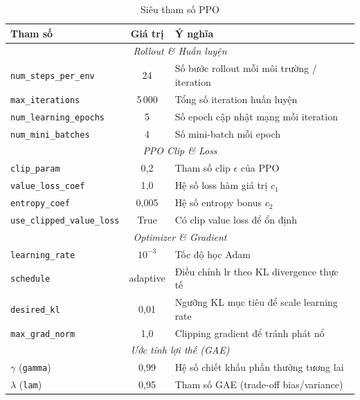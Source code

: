 \begin{table}[H]
    \centering
    \caption{Siêu tham số PPO}
    \label{tab:ppo_cfg}
    \renewcommand{\arraystretch}{1.3}
    \begin{tabular}{|l|c|l|}
    \hline
    \textbf{Tham số} & \textbf{Giá trị} & \textbf{Ý nghĩa} \\
    \hline
    \multicolumn{3}{|c|}{\textit{Rollout \& Huấn luyện}} \\
    \hline
    \texttt{num\_steps\_per\_env}    & 24      & Số bước rollout mỗi môi trường / iteration \\
    \texttt{max\_iterations}         & 5\,000  & Tổng số iteration huấn luyện \\
    \texttt{num\_learning\_epochs}   & 5       & Số epoch cập nhật mạng mỗi iteration \\
    \texttt{num\_mini\_batches}      & 4       & Số mini-batch mỗi epoch \\
    \hline
    \multicolumn{3}{|c|}{\textit{PPO Clip \& Loss}} \\
    \hline
    \texttt{clip\_param}             & 0{,}2   & Tham số clip $\epsilon$ của PPO \\
    \texttt{value\_loss\_coef}       & 1{,}0   & Hệ số loss hàm giá trị $c_1$ \\
    \texttt{entropy\_coef}           & 0{,}005 & Hệ số entropy bonus $c_2$ \\
    \texttt{use\_clipped\_value\_loss}& True   & Có clip value loss để ổn định \\
    \hline
    \multicolumn{3}{|c|}{\textit{Optimizer \& Gradient}} \\
    \hline
    \texttt{learning\_rate}          & $10^{-3}$ & Tốc độ học Adam \\
    \texttt{schedule}                & adaptive  & Điều chỉnh lr theo KL divergence thực tế \\
    \texttt{desired\_kl}             & 0{,}01  & Ngưỡng KL mục tiêu để scale learning rate \\
    \texttt{max\_grad\_norm}         & 1{,}0   & Clipping gradient để tránh phát nổ \\
    \hline
    \multicolumn{3}{|c|}{\textit{Ước tính lợi thế (GAE)}} \\
    \hline
    $\gamma$ (\texttt{gamma})        & 0{,}99  & Hệ số chiết khấu phần thưởng tương lai \\
    $\lambda$ (\texttt{lam})         & 0{,}95  & Tham số GAE (trade-off bias/variance) \\
    \hline
    \end{tabular}
\end{table}

